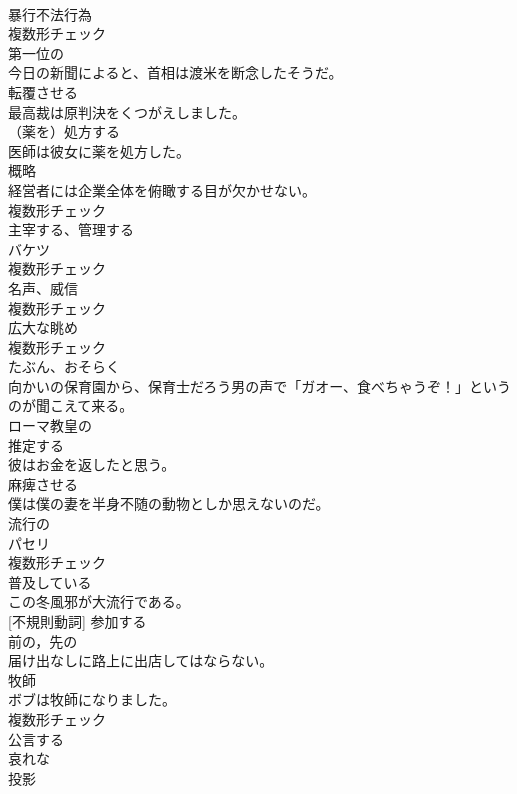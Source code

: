 \documentclass[8pt]{extreport}
\begin{document}
\begin{CJK}{UTF8}{min}
\\	[名詞]	暴行不法行為	
\\	複数形チェック
\\	[形容詞]	第一位の	
\\	今日の新聞によると、首相は渡米を断念したそうだ。	
\\	[動詞]	転覆させる	
\\	最高裁は原判決をくつがえしました。	
\\	[動詞]	（薬を）処方する	
\\	医師は彼女に薬を処方した。	
\\	[名詞]	概略	
\\	経営者には企業全体を俯瞰する目が欠かせない。	
\\	複数形チェック
\\	[動詞]	主宰する、管理する	
\\	[名詞]	バケツ	
\\	複数形チェック
\\	[名詞]	名声、威信	
\\	複数形チェック
\\	[名詞]	広大な眺め	
\\	複数形チェック
\\	[形容詞]	たぶん、おそらく	
\\	向かいの保育園から、保育士だろう男の声で「ガオー、食べちゃうぞ！」というのが聞こえて来る。	
\\	[形容詞]	ローマ教皇の	
\\	[動詞]	推定する	
\\	彼はお金を返したと思う。	
\\	[動詞]	麻痺させる	
\\	僕は僕の妻を半身不随の動物としか思えないのだ。	
\\	[形容詞]	流行の	
\\	[名詞]	パセリ	
\\	複数形チェック
\\	[形容詞]	普及している	
\\	この冬風邪が大流行である。	
\\	[動詞] [不規則動詞]	参加する	
\\	[形容詞]	前の，先の	
\\	届け出なしに路上に出店してはならない。	
\\	[名詞]	牧師	
\\	ボブは牧師になりました。	
\\	複数形チェック
\\	[動詞]	公言する	
\\	[形容詞]	哀れな	
\\	[名詞]	投影	

\end{CJK}
\end{document}
